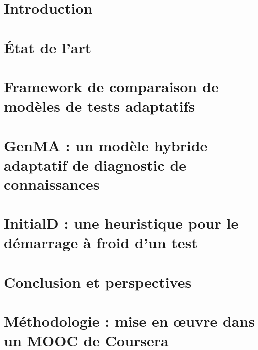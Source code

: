 \documentclass[a4paper,14pt,draft]{memoir}
\begin{document}
\tableofcontents

\chapter{Introduction}


\chapter{État de l'art}


\chapter{Framework de comparaison de modèles de tests adaptatifs}



\chapter{GenMA : un modèle hybride adaptatif de diagnostic de connaissances}




\chapter{InitialD : une heuristique pour le démarrage à froid d'un test}




\chapter{Conclusion et perspectives}


\appendix

\chapter{Méthodologie : mise en œuvre dans un MOOC de Coursera}


\printbibliography
\end{document}
